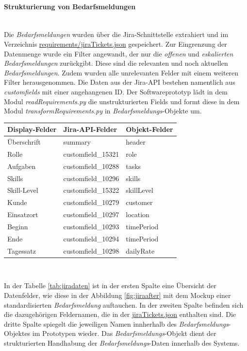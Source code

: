 \paragraph{Strukturierung von Bedarfsmeldungen}\mbox{}\\
Die \emph{Bedarfsmeldungen} wurden über die Jira-Schnittstelle extrahiert und im Verzeichnis \url{requirements/jiraTickets.json} gespeichert. Zur Eingrenzung der Datenmenge wurde ein Filter angewandt, der nur die \emph{offenen} und \emph{eskalierten} \emph{Bedarfsmeldungen} zurückgibt. Diese sind die relevanten und noch aktuellen \emph{Bedarfsmeldungen}. Zudem wurden alle unrelevanten Felder mit einem weiteren Filter herausgenommen. Die Daten aus der Jira-API bestehen namentlich aus \emph{customfields} mit einer angehangenen ID. Der Softwareprototyp lädt in dem Modul \emph{readRequirements.py} die unstrukturierten Fields und formt diese in dem Modul \emph{transformRequirements.py} in \emph{Bedarfsmeldungs}-Objekte um.
\begin{center}
	\begin{tabularx}{1\textwidth} { 
			| >{\raggedright\arraybackslash}X 
			| >{\raggedright\arraybackslash}X
			| >{\raggedright\arraybackslash}X | }
		\hline
		Display-Felder & Jira-API-Felder & Objekt-Felder \\
		\hline
		\hline
		Überschrift & summary & header\\
		\hline
		Rolle & customfield\_15321 & role\\
		\hline
		Aufgaben & customfield\_10288 & tasks\\
		\hline
		Skills & customfield\_10296 & skills\\
		\hline
		Skill-Level & customfield\_15322 & skillLevel\\
		\hline
		Kunde & customfield\_10279 & customer\\
		\hline
		Einsatzort & customfield\_10297 & location\\
		\hline
		Beginn & customfield\_10293 & timePeriod\\
		\hline
		Ende & customfield\_10294 & timePeriod\\
		\hline
		Tagessatz & customfield\_10298 & dailyRate\\
		\hline
	\end{tabularx}\\
	\label{tab:jiradaten}
\end{center}
In der Tabelle \ref{tab:jiradaten} ist in der ersten Spalte eine Übersicht der Datenfelder, wie diese in der Abbildung \ref{fig:jiraafter} mit dem Mockup einer standardisierten \emph{Bedarfsmeldung} auftauchen. In der zweiten Spalte befinden sich die dazugehörigen Feldernamen, die in der \url{jiraTickets.json} enthalten sind. Die dritte Spalte spiegelt die jeweiligen Namen innherhalb des  \emph{Bedarfsmeldungs}-Objektes im Prototypen wieder. Das  \emph{Bedarfsmeldungs}-Objekt dient der strukturierten Handhabung der \emph{Bedarfsmeldungs}-Daten innerhalb des Systems.

